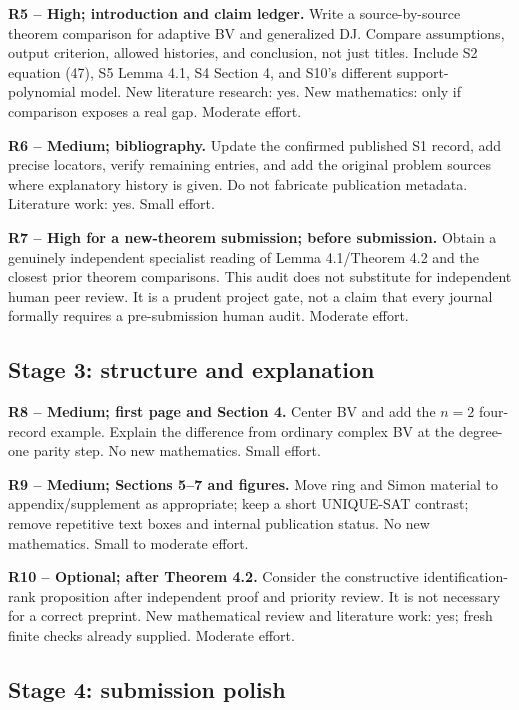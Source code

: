 \documentclass[
  11pt,
]{article}
\begin{document}
\textbf{R5 -- High; introduction and claim ledger.} Write a
source-by-source theorem comparison for adaptive BV and generalized DJ.
Compare assumptions, output criterion, allowed histories, and
conclusion, not just titles. Include S2 equation (47), S5 Lemma 4.1, S4
Section 4, and S10's different support-polynomial model. New literature
research: yes. New mathematics: only if comparison exposes a real gap.
Moderate effort.

\textbf{R6 -- Medium; bibliography.} Update the confirmed published S1
record, add precise locators, verify remaining entries, and add the
original problem sources where explanatory history is given. Do not
fabricate publication metadata. Literature work: yes. Small effort.

\textbf{R7 -- High for a new-theorem submission; before submission.}
Obtain a genuinely independent specialist reading of Lemma 4.1/Theorem
4.2 and the closest prior theorem comparisons. This audit does not
substitute for independent human peer review. It is a prudent project
gate, not a claim that every journal formally requires a pre-submission
human audit. Moderate effort.

\subsection{Stage 3: structure and
explanation}\label{stage-3-structure-and-explanation}

\textbf{R8 -- Medium; first page and Section 4.} Center BV and add the
\(n=2\) four-record example. Explain the difference from ordinary
complex BV at the degree-one parity step. No new mathematics. Small
effort.

\textbf{R9 -- Medium; Sections 5--7 and figures.} Move ring and Simon
material to appendix/supplement as appropriate; keep a short UNIQUE-SAT
contrast; remove repetitive text boxes and internal publication status.
No new mathematics. Small to moderate effort.

\textbf{R10 -- Optional; after Theorem 4.2.} Consider the constructive
identification-rank proposition after independent proof and priority
review. It is not necessary for a correct preprint. New mathematical
review and literature work: yes; fresh finite checks already supplied.
Moderate effort.

\subsection{Stage 4: submission polish}\label{stage-4-submission-polish}
\end{document}

